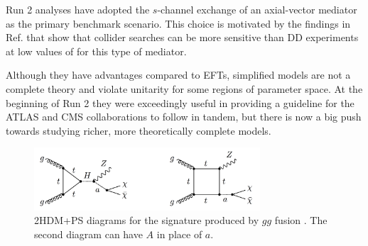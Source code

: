 



Run 2 \monoX analyses have adopted the $s$-channel exchange of an axial-vector mediator as the primary benchmark scenario. This choice is motivated by the findings in Ref. \cite{Boveia:2016mrp} that show that collider searches can be more sensitive than DD experiments at low values of \mchi for this type of mediator. 

Although they have advantages compared to EFTs, simplified models are not a complete theory and violate unitarity for some regions of parameter space. At the beginning of Run 2 they were exceedingly useful in providing a guideline for the ATLAS and CMS collaborations to follow in tandem, but there is now a big push towards studying richer, more theoretically complete models. 

\begin{figure}[htb]
\centering
\includegraphics[width=0.75\textwidth]{Figures/2hdma.png}
\caption{2HDM+PS diagrams for the \monoZ signature produced by $gg$ fusion \cite{Bauer:2017ota}. The second diagram can have $A$ in place of $a$.}
\label{fig:2hdma}
\end{figure}

